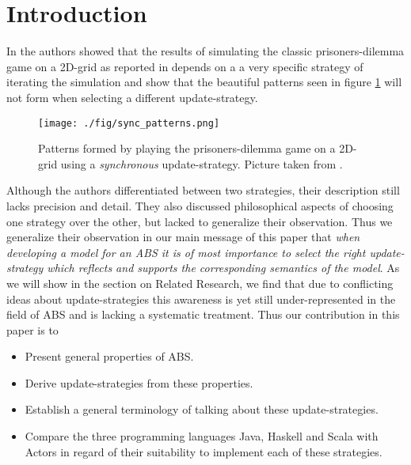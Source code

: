 \section{Introduction}
In \cite{huberman_evolutionary_1993} the authors showed that the results of simulating the classic prisoners-dilemma game on a 2D-grid as reported in \cite{nowak_evolutionary_1992} depends on a a very specific strategy of iterating the simulation and show that the beautiful patterns seen in figure \ref{fig:sync_patterns} will not form when selecting a different update-strategy.

\begin{figure}[H]
	\centering
  \texttt{[image: ./fig/sync\_patterns.png]}
	\caption{Patterns formed by playing the prisoners-dilemma game on a 2D-grid using a \textit{synchronous} update-strategy. Picture taken from \cite{huberman_evolutionary_1993}.}
	\label{fig:sync_patterns}
\end{figure}

Although the authors differentiated between two strategies, their description still lacks precision and detail. They also discussed philosophical aspects of choosing one strategy over the other, but lacked to generalize their observation. Thus we generalize their observation in our main message of this paper that \textit{when developing a model for an ABS it is of most importance to select the right update-strategy which reflects and supports the corresponding semantics of the model}. As we will show in the section on Related Research, we find that due to conflicting ideas about update-strategies this awareness is yet still under-represented in the field of ABS and is lacking a systematic treatment. Thus our contribution in this paper is to
\begin{itemize}
	\item Present general properties of ABS.
	\item Derive update-strategies from these properties.
	\item Establish a general terminology of talking about these update-strategies.
	\item Compare the three programming languages Java, Haskell and Scala with Actors in regard of their suitability to implement each of these strategies.
\end{itemize}

